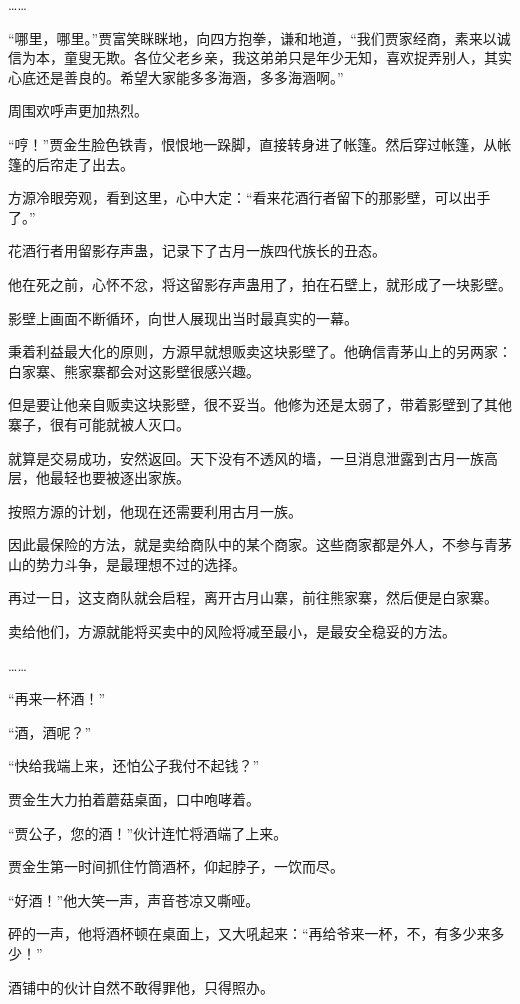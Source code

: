 \begin{this_body}
……

“哪里，哪里。”贾富笑眯眯地，向四方抱拳，谦和地道，“我们贾家经商，素来以诚信为本，童叟无欺。各位父老乡亲，我这弟弟只是年少无知，喜欢捉弄别人，其实心底还是善良的。希望大家能多多海涵，多多海涵啊。”

周围欢呼声更加热烈。

“哼！”贾金生脸色铁青，恨恨地一跺脚，直接转身进了帐篷。然后穿过帐篷，从帐篷的后帘走了出去。

方源冷眼旁观，看到这里，心中大定：“看来花酒行者留下的那影壁，可以出手了。”

花酒行者用留影存声蛊，记录下了古月一族四代族长的丑态。

他在死之前，心怀不忿，将这留影存声蛊用了，拍在石壁上，就形成了一块影壁。

影壁上画面不断循环，向世人展现出当时最真实的一幕。

秉着利益最大化的原则，方源早就想贩卖这块影壁了。他确信青茅山上的另两家：白家寨、熊家寨都会对这影壁很感兴趣。

但是要让他亲自贩卖这块影壁，很不妥当。他修为还是太弱了，带着影壁到了其他寨子，很有可能就被人灭口。

就算是交易成功，安然返回。天下没有不透风的墙，一旦消息泄露到古月一族高层，他最轻也要被逐出家族。

按照方源的计划，他现在还需要利用古月一族。

因此最保险的方法，就是卖给商队中的某个商家。这些商家都是外人，不参与青茅山的势力斗争，是最理想不过的选择。

再过一日，这支商队就会启程，离开古月山寨，前往熊家寨，然后便是白家寨。

卖给他们，方源就能将买卖中的风险将减至最小，是最安全稳妥的方法。

……

“再来一杯酒！”

“酒，酒呢？”

“快给我端上来，还怕公子我付不起钱？”

贾金生大力拍着蘑菇桌面，口中咆哮着。

“贾公子，您的酒！”伙计连忙将酒端了上来。

贾金生第一时间抓住竹筒酒杯，仰起脖子，一饮而尽。

“好酒！”他大笑一声，声音苍凉又嘶哑。

砰的一声，他将酒杯顿在桌面上，又大吼起来：“再给爷来一杯，不，有多少来多少！”

酒铺中的伙计自然不敢得罪他，只得照办。


\end{this_body}
